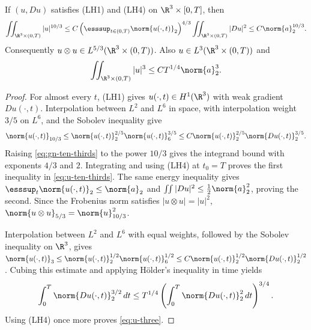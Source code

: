 \documentclass[11pt,reqno]{amsart}
\begin{document}
\begin{lemma}\label{lem:u-ten-thirds}
If $(u,Du)$ satisfies (LH1) and (LH4) on $\R^3\times[0,T]$, then
\begin{equation}\label{eq:u-ten-thirds}
\iint_{\R^3\times(0,T)}|u|^{10/3}
\le C\left(\esssup_{t\in(0,T)}\norm{u(\cdot,t)}_2\right)^{4/3}
\iint_{\R^3\times(0,T)}|Du|^2
\le C\norm{a}_2^{10/3}.
\end{equation}
Consequently $u\otimes u\in L^{5/3}(\R^3\times(0,T))$. Also
$u\in L^3(\R^3\times(0,T))$ and
\begin{equation}\label{eq:u-three}
\iint_{\R^3\times(0,T)}|u|^3
\le C T^{1/4}\norm{a}_2^{3}.
\end{equation}
\end{lemma}

\begin{proof}
For almost every $t$, (LH1) gives $u(\cdot,t)\in H^1(\R^3)$ with weak
gradient $Du(\cdot,t)$. Interpolation between $L^2$ and $L^6$ in space,
with interpolation weight $3/5$ on $L^6$, and the Sobolev inequality give
\begin{equation}\label{eq:gn-ten-thirds}
\norm{u(\cdot,t)}_{10/3}
\le \norm{u(\cdot,t)}_2^{2/5}\norm{u(\cdot,t)}_6^{3/5}
\le C\norm{u(\cdot,t)}_2^{2/5}\norm{Du(\cdot,t)}_2^{3/5}.
\end{equation}
Raising \eqref{eq:gn-ten-thirds} to the power $10/3$ gives the integrand
bound with exponents $4/3$ and $2$.
Integrating and using (LH4) at $t_0=T$ proves the first inequality in
\eqref{eq:u-ten-thirds}. The same energy inequality gives
$\esssup_t\norm{u(\cdot,t)}_2\le\norm{a}_2$ and
$\iint|Du|^2\le\frac12\norm{a}_2^2$, proving the second. Since the
Frobenius norm satisfies $|u\otimes u|=|u|^2$,
$\norm{u\otimes u}_{5/3}=\norm{u}_{10/3}^2$.

Interpolation between $L^2$ and $L^6$ with equal weights, followed by the
Sobolev inequality on $\R^3$, gives
$\norm{u(\cdot,t)}_3\le \norm{u(\cdot,t)}_2^{1/2}
\norm{u(\cdot,t)}_6^{1/2}\le C\norm{u(\cdot,t)}_2^{1/2}
\norm{Du(\cdot,t)}_2^{1/2}$. Cubing this estimate and applying Hölder's
inequality in time yields
\begin{equation*}
\int_0^T\norm{Du(\cdot,t)}_2^{3/2}\,dt
\le T^{1/4}\left(\int_0^T\norm{Du(\cdot,t)}_2^2\,dt\right)^{3/4}.
\end{equation*}
Using (LH4) once more proves \eqref{eq:u-three}.
\end{proof}
\end{document}
